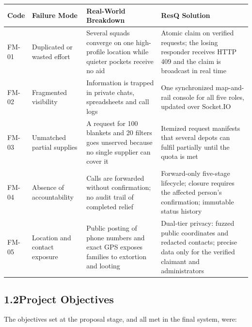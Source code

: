 \documentclass[11pt,a4paper]{article}
\begin{document}
\renewcommand{\arraystretch}{1.25}
\begin{tabularx}{\textwidth}{@{}p{0.5in}p{1.25in}p{1.8in}X@{}}
\toprule
\textbf{Code} & \textbf{Failure Mode} & \textbf{Real-World Breakdown} & \textbf{ResQ Solution}\\
\midrule
FM-01 & Duplicated or wasted effort & Several squads converge on one high-profile location while quieter pockets receive no aid & Atomic claim on verified requests; the losing responder receives HTTP 409 and the claim is broadcast in real time\\
FM-02 & Fragmented visibility & Information is trapped in private chats, spreadsheets and call logs & One synchronized map-and-rail console for all five roles, updated over Socket.IO\\
FM-03 & Unmatched partial supplies & A request for 100 blankets and 20 filters goes unserved because no single supplier can cover it & Itemized request manifests that several depots can fulfil partially until the quota is met\\
FM-04 & Absence of accountability & Calls are forwarded without confirmation; no audit trail of completed relief & Forward-only five-stage lifecycle; closure requires the affected person's confirmation; immutable status history\\
FM-05 & Location and contact exposure & Public posting of phone numbers and exact GPS exposes families to extortion and looting & Dual-tier privacy: fuzzed public coordinates and redacted contacts; precise data only for the verified claimant and administrators\\
\bottomrule
\end{tabularx}
\renewcommand{\arraystretch}{1}

\subsection{1.2\quad Project Objectives}\label{s12}

The objectives set at the proposal stage, and all met in the final system, were:
\end{document}

